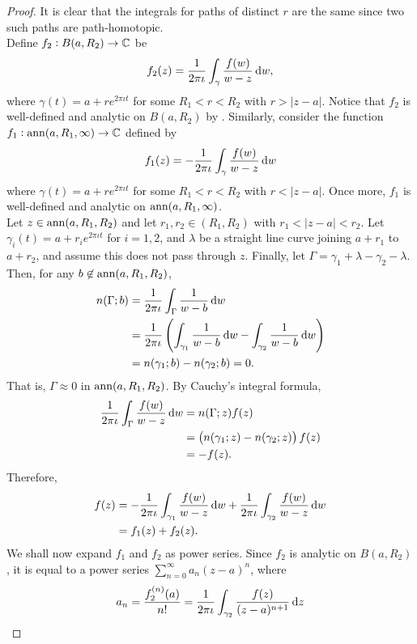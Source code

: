 	\begin{proof}
		It is clear that the integrals for paths of distinct $r$ are the same since two such paths are path-homotopic.\\
		Define $f_2 : B(a,R_2) \to \mathbb{C}$ be
		\[ f_2(z) = \frac{1}{2\pi\iota} \int_{\gamma} \frac{f(w)}{w-z} \dif w, \]
		where $\gamma(t) = a+re^{2\pi\iota t}$ for some $R_1 < r < R_2$ with $r > |z-a|$. Notice that $f_2$ is well-defined and analytic on $B(a,R_2)$ by . Similarly, consider the function $f_1 : \operatorname{ann}(a,R_1,\infty) \to \mathbb{C}$ defined by
		\[ f_1(z) = - \frac{1}{2\pi\iota} \int_{\gamma} \frac{f(w)}{w-z} \dif w \]
		where $\gamma(t) = a+re^{2\pi\iota t}$ for some $R_1 < r < R_2$ with $r < |z-a|$. Once more, $f_1$ is well-defined and analytic on $\operatorname{ann}(a,R_1,\infty)$.\\
		Let $z \in \operatorname{ann}(a,R_1,R_2)$ and let $r_1,r_2 \in (R_1,R_2)$ with $r_1 < |z-a| < r_2$. Let $\gamma_i(t) = a + r_i e^{2\pi\iota t}$ for $i=1,2$, and $\lambda$ be a straight line curve joining $a+r_1$ to $a+r_2$, and assume this does not pass through $z$. Finally, let $\Gamma = \gamma_1 + \lambda - \gamma_2 - \lambda$. Then, for any $b \not\in \operatorname{ann}(a,R_1,R_2)$,
		\begin{align*}
			n(\Gamma;b) &= \frac{1}{2\pi\iota} \int_{\Gamma} \frac{1}{w-b} \dif w \\
				&= \frac{1}{2\pi\iota} \left( \int_{\gamma_1} \frac{1}{w-b} \dif w - \int_{\gamma_2} \frac{1}{w-b} \dif w \right) \\
				&= n(\gamma_1;b) - n(\gamma_2;b) = 0.
		\end{align*}
		That is, $\Gamma \approx 0$ in $\operatorname{ann}(a,R_1,R_2)$. By Cauchy's integral formula,
		\begin{align*}
			\frac{1}{2\pi\iota} \int_{\Gamma} \frac{f(w)}{w-z} \dif w &= n(\Gamma;z) f(z) \\
				&= \left( n(\gamma_1;z) - n(\gamma_2;z) \right) f(z) \\
				&= -f(z).
		\end{align*}
		Therefore,
		\begin{align*}
			f(z) &= - \frac{1}{2\pi\iota} \int_{\gamma_1} \frac{f(w)}{w-z} \dif w + \frac{1}{2\pi\iota} \int_{\gamma_2} \frac{f(w)}{w-z} \dif w \\
				&= f_1(z) + f_2(z).
		\end{align*}
		We shall now expand $f_1$ and $f_2$ as power series. Since $f_2$ is analytic on $B(a,R_2)$, it is equal to a power series $\sum_{n=0}^{\infty} a_n (z-a)^n$, where
		\[ a_n = \frac{f_2^{(n)}(a)}{n!} = \frac{1}{2\pi\iota} \int_{\gamma_2} \frac{f(z)}{(z-a)^{n+1}} \dif z \]

\end{proof}
